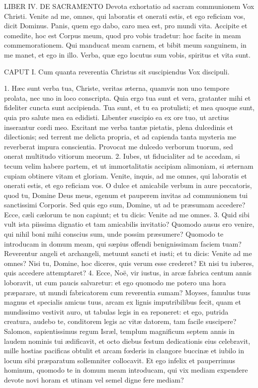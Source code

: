 LIBER IV.
DE SACRAMENTO
Devota exhortatio ad sacram communionem
Vox Christi.
Venite ad me, omnes, qui laboratis et onerati estis, et ego reficiam vos, dicit Dominus. Panis, quem ego dabo, caro mea est, pro mundi vita. Accipite et comedite, hoc est Corpus meum, quod pro vobis tradetur: hoc facite in meam commemorationem. Qui manducat meam carnem, et bibit meum sanguinem, in me manet, et ego in illo. Verba, quæ ego locutus sum vobis, spiritus et vita sunt.


CAPUT I.
Cum quanta reverentia Christus sit suscipiendus
Vox discipuli.

1. Hæc sunt verba tua, Christe, veritas æterna, quamvis non uno tempore prolata, nec uno in loco conscripta. Quia ergo tua sunt et vera, gratanter mihi et fideliter cuncta sunt accipienda. Tua sunt, et tu ea protulisti; et mea quoque sunt, quia pro salute mea ea edidisti. Libenter suscipio ea ex ore tuo, ut arctius inserantur cordi meo. Excitant me verba tantæ pietatis, plena dulcedinis et dilectionis; sed terrent me delicta propria, et ad capienda tanta mysteria me reverberat impura conscientia. Provocat me dulcedo verborum tuorum, sed onerat multitudo vitiorum meorum.
2. Iubes, ut fiducialiter ad te accedam, si tecum velim habere partem, et ut immortalitatis accipiam alimoniam, si æternam cupiam obtinere vitam et gloriam. Venite, inquis, ad me omnes, qui laboratis et onerati estis, et ego reficiam vos. O dulce et amicabile verbum in aure peccatoris, quod tu, Domine Deus meus, egenum et pauperem invitas ad communionem tui sanctissimi Corporis. Sed quis ego sum, Domine, ut ad te præsumam accedere? Ecce, cæli cælorum te non capiunt; et tu dicis: Venite ad me omnes.
3. Quid sibi vult ista piissima dignatio et tam amicabilis invitatio? Quomodo ausus ero venire, qui nihil boni mihi conscius sum, unde possim præsumere? Quomodo te introducam in domum meam, qui sæpius offendi benignissimam faciem tuam? Reverentur angeli et archangeli, metuunt sancti et iusti; et tu dicis: Venite ad me omnes? Nisi tu, Domine, hoc diceres, quis verum esse crederet? Et nisi tu iuberes, quis accedere attemptaret?
4. Ecce, Noë, vir iustus, in arcæ fabrica centum annis loboravit, ut cum paucis salvaretur: et ego quomodo me potero una hora præparare, ut mundi fabricatorem cum reverentia sumam? Moyses, famulus tuus magnus et specialis amicus tuus, arcam ex lignis imputribilibus fecit, quam et mundissimo vestivit auro, ut tabulas legis in ea reponeret: et ego, putrida creatura, audebo te, conditorem legis ac vitæ datorem, tam facile suscipere? Salomon, sapientissimus regum Isræl, templum magnificum septem annis in laudem nominis tui ædificavit, et octo diebus festum dedicationis eius celebravit, mille hostias pacificas obtulit et arcam fœderis in clangore buccinæ et iubilo in locum sibi præparatum sollemniter collocavit. Et ego infelix et pauperrimus hominum, quomodo te in domum meam introducam, qui vix mediam expendere devote novi horam et utinam vel semel digne fere mediam?
